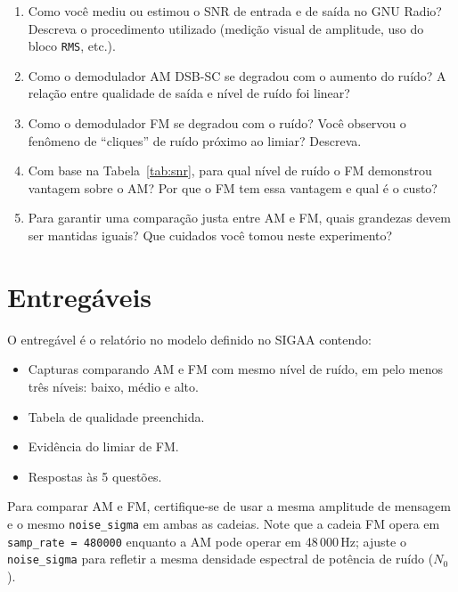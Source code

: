 \documentclass[11pt,a4paper]{article}
\begin{document}
\begin{enumerate}[label=\textbf{Q\arabic*.}, leftmargin=*]

  \item Como você mediu ou estimou o SNR de entrada e de saída no GNU Radio?
    Descreva o procedimento utilizado (medição visual de amplitude, uso do
    bloco \texttt{RMS}, etc.).

  \item Como o demodulador AM DSB-SC se degradou com o aumento do ruído?
    A relação entre qualidade de saída e nível de ruído foi linear?

  \item Como o demodulador FM se degradou com o ruído? Você observou o
    fenômeno de ``cliques'' de ruído próximo ao limiar? Descreva.

  \item Com base na Tabela~\ref{tab:snr}, para qual nível de ruído o FM
    demonstrou vantagem sobre o AM? Por que o FM tem essa vantagem e qual
    é o custo?

  \item Para garantir uma comparação justa entre AM e FM, quais grandezas
    devem ser mantidas iguais? Que cuidados você tomou neste experimento?

\end{enumerate}

\section{Entregáveis}

O entregável é o relatório no modelo definido no SIGAA contendo:

\begin{itemize}
  \item Capturas comparando AM e FM com mesmo nível de ruído, em pelo
    menos três níveis: baixo, médio e alto.
  \item Tabela de qualidade preenchida.
  \item Evidência do limiar de FM.
  \item Respostas às 5 questões.
\end{itemize}

\begin{atencao}
Para comparar AM e FM, certifique-se de usar a mesma amplitude de mensagem
e o mesmo \texttt{noise\_sigma} em ambas as cadeias.  Note que a cadeia FM
opera em \texttt{samp\_rate = 480000} enquanto a AM pode operar em
48\,000\,Hz; ajuste o \texttt{noise\_sigma} para refletir a mesma
densidade espectral de potência de ruído ($N_0$).
\end{atencao}
\end{document}
